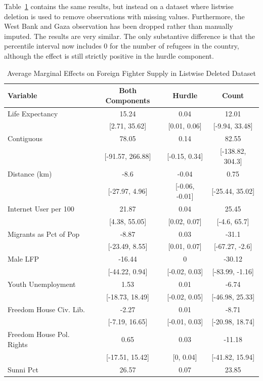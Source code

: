 \documentclass[12pt]{article}
\begin{document}
Table~\ref{tab:appeffectslist} contains the same results, but instead on a dataset where listwise deletion is used to remove observations with missing values. Furthermore, the West Bank and Gaza observation has been dropped rather than manually imputed. The results are very similar. The only substantive difference is that the percentile interval now includes 0 for the number of refugees in the country, although the effect is still strictly positive in the hurdle component.

\begin{table}[!p]
	\footnotesize
	\centering
	\caption{Average Marginal Effects on Foreign Fighter Supply in Listwise Deleted Dataset} 	\label{tab:appeffectslist}
	\begin{tabular}{l ccc}
		\toprule
		Variable & \multicolumn{1}{c}{Both Components} & \multicolumn{1}{c}{Hurdle} & \multicolumn{1}{c}{Count} \\ 
		\midrule
Life Expectancy & 15.24 & 0.04 & 12.01 \\ 
& [2.71, 35.62] & [0.01, 0.06] & [-9.94, 33.48] \\ 
Contiguous & 78.05 & 0.14 & 82.55 \\ 
& [-91.57, 266.88] & [-0.15, 0.34] & [-138.82, 304.3] \\ 
Distance (km) & -8.6 & -0.04 & 0.75 \\ 
& [-27.97, 4.96] & [-0.06, -0.01] & [-25.44, 35.02] \\ 
Internet User per 100 & 21.87 & 0.04 & 25.45 \\ 
& [4.38, 55.05] & [0.02, 0.07] & [-4.6, 65.7] \\ 
Migrants as Pct of Pop & -8.87 & 0.03 & -31.1 \\ 
& [-23.49, 8.55] & [0.01, 0.07] & [-67.27, -2.6] \\ 
Male LFP & -16.44 & 0 & -30.12 \\ 
& [-44.22, 0.94] & [-0.02, 0.03] & [-83.99, -1.16] \\ 
Youth Unemployment & 1.53 & 0.01 & -6.74 \\ 
& [-18.73, 18.49] & [-0.02, 0.05] & [-46.98, 25.33] \\ 
Freedom House Civ. Lib. & -2.27 & 0.01 & -8.71 \\ 
& [-7.19, 16.65] & [-0.01, 0.03] & [-20.98, 18.74] \\ 
Freedom House Pol. Rights & 0.65 & 0.03 & -11.18 \\ 
& [-17.51, 15.42] & [0, 0.04] & [-41.82, 15.94] \\ 
Sunni Pct & 26.57 & 0.07 & 23.85 \\ 

\end{tabular}
\end{table}
\end{document}
